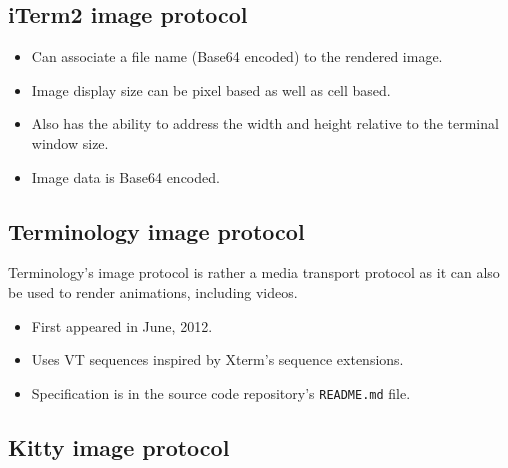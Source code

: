 \documentclass[a4paper]{article}
\begin{document}
\subsection{iTerm2 image protocol}

\begin{itemize}
    \item Can associate a file name (Base64 encoded) to the rendered image.
    \item Image display size can be pixel based as well as cell based.
    \item Also has the ability to address the width and height relative to the terminal window size.
    \item Image data is Base64 encoded.
\end{itemize}


\subsection{Terminology image protocol}

Terminology's image protocol is rather a media transport protocol as it
can also be used to render animations, including videos.

\begin{itemize}
    \item First appeared in June, 2012.
    \item Uses VT sequences inspired by Xterm's sequence extensions.
    \item Specification is in the source code repository's \texttt{README.md} file.
\end{itemize}

\subsection{Kitty image protocol}
\end{document}
